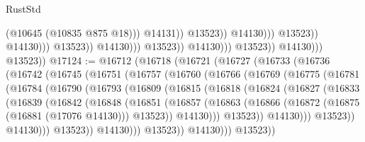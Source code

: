 \begin{lexlean}{RustStd}
\begin{coremodule}
                                                                (@10645 (@10835 @875 @18)))
                                                              @14131))
                                                          @13523))
                                                      @14130)))
                                                @13523))
                                            @14130)))
                                      @13523))
                                  @14130)))
                            @13523))
                        @14130)))
                  @13523))
              @14130)))
        @13523))
@17124 := @16712
    (@16718
      (@16721
        (@16727
          (@16733
            (@16736
              (@16742
                (@16745
                  (@16751
                    (@16757
                      (@16760
                        (@16766
                          (@16769
                            (@16775
                              (@16781
                                (@16784
                                  (@16790
                                    (@16793
                                      (@16809
                                        (@16815
                                          (@16818
                                            (@16824
                                              (@16827
                                                (@16833
                                                  (@16839
                                                    (@16842
                                                      (@16848
                                                        (@16851
                                                          (@16857
                                                            (@16863
                                                              (@16866
                                                                (@16872
                                                                  (@16875 (@16881 (@17076 @14130)))
                                                                  @13523))
                                                              @14130)))
                                                        @13523))
                                                    @14130)))
                                              @13523))
                                          @14130)))
                                    @13523))
                                @14130)))
                          @13523))
                      @14130)))
                @13523))

\end{coremodule}
\end{lexlean}
